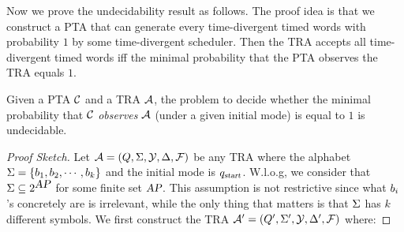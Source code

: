 Now we prove the undecidability result as follows.
The proof idea is that we construct a PTA that can generate every time-divergent timed words with probability $1$ by some time-divergent scheduler.
Then the TRA accepts all time-divergent timed words iff the minimal probability that the PTA observes the TRA equals $1$.
%
\begin{theorem}\label{thm:traundecidability}
Given a PTA $\mathcal{C}$ and a TRA $\mathcal{A}$, the problem to decide whether the minimal probability
that $\mathcal{C}$ \emph{observes} $\mathcal{A}$ (under a given initial mode) is equal to $1$ is undecidable.
\end{theorem}
%
\begin{proof}[Proof Sketch]
Let $\mathcal{A}=(Q,\Sigma,\mathcal{Y},\Delta,\mathcal{F})$ be any TRA where the alphabet $\Sigma = \{b_{1}, b_{2}, \cdots, b_{k}\}$ and the initial mode is $q_{\mbox{\sl\scriptsize start}}$.
W.l.o.g, we consider that $\Sigma\subseteq 2^{\mbox{\sl AP}}$ for some finite set $\mbox{\sl AP}$.
This assumption is not restrictive since what $b_{i}$'s concretely are is irrelevant, while the only thing that matters is that $\Sigma$ has $k$ different symbols.
We first construct the TRA $\mathcal{A}' = (Q', \Sigma', \mathcal{Y}, \Delta',\mathcal{F})$ where:


\end{proof}

